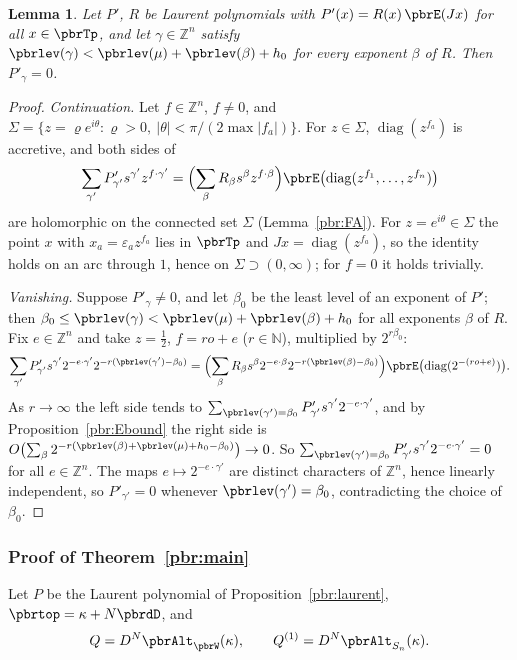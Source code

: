 \documentclass[10pt]{amsart}
\newtheorem{lemma}[theorem]{Lemma}
\theoremstyle{definition}
\theoremstyle{remark}
\newcommand{\N}{\mathbb N}
\newcommand{\Z}{\mathbb Z}
\begin{document}
\begin{lemma}\label{pbr:low}
Let $P'$, $R$ be Laurent polynomials with $P'(x)=R(x)\,\pbrE(Jx)$ for all $x\in\pbrTp$, and let
$\gamma\in\Z^n$ satisfy $\pbrlev(\gamma)<\pbrlev(\mu)+\pbrlev(\beta)+h_0$ for every exponent $\beta$ of
$R$. Then $P'_\gamma=0$.
\end{lemma}
\begin{proof}
\emph{Continuation.} Let $f\in\Z^n$, $f\ne0$, and $\Sigma=\{z=\varrho e^{i\theta}:\varrho>0,\ |\theta|<
\pi/(2\max|f_a|)\}$. For $z\in\Sigma$, $\operatorname{diag}(z^{f_a})$ is accretive, and both sides of
\[
\sum_{\gamma'}P'_{\gamma'}s^{\gamma'}z^{f\cdot\gamma'}=\Bigl(\sum_\beta R_\beta s^\beta z^{f\cdot\beta}
\Bigr)\pbrE\bigl(\operatorname{diag}(z^{f_1},\dots,z^{f_n})\bigr)
\]
are holomorphic on the connected set $\Sigma$ (Lemma~\ref{pbr:FA}). For $z=e^{i\theta}\in\Sigma$ the
point $x$ with $x_a=\varepsilon_az^{f_a}$ lies in $\pbrTp$ and $Jx=\operatorname{diag}(z^{f_a})$, so
the identity holds on an arc through $1$, hence on $\Sigma\supset(0,\infty)$; for $f=0$ it holds
trivially.

\emph{Vanishing.} Suppose $P'_\gamma\ne0$, and let $\beta_0$ be the least level of an exponent of $P'$;
then $\beta_0\le\pbrlev(\gamma)<\pbrlev(\mu)+\pbrlev(\beta)+h_0$ for all exponents $\beta$ of $R$. Fix
$e\in\Z^n$ and take $z=\frac12$, $f=ro+e$ ($r\in\N$), multiplied by $2^{r\beta_0}$:
\[
\sum_{\gamma'}P'_{\gamma'}s^{\gamma'}2^{-e\cdot\gamma'}2^{-r(\pbrlev(\gamma')-\beta_0)}=\Bigl(\sum_\beta
R_\beta s^\beta2^{-e\cdot\beta}2^{-r(\pbrlev(\beta)-\beta_0)}\Bigr)\pbrE\bigl(\operatorname{diag}(
2^{-(ro+e)})\bigr).
\]
As $r\to\infty$ the left side tends to $\sum_{\pbrlev(\gamma')=\beta_0}P'_{\gamma'}s^{\gamma'}2^{-e\cdot
\gamma'}$, and by Proposition~\ref{pbr:Ebound} the right side is $O\bigl(\sum_\beta2^{-r(\pbrlev(\beta)
+\pbrlev(\mu)+h_0-\beta_0)}\bigr)\to0$. So $\sum_{\pbrlev(\gamma')=\beta_0}P'_{\gamma'}s^{\gamma'}
2^{-e\cdot\gamma'}=0$ for all $e\in\Z^n$. The maps $e\mapsto2^{-e\cdot\gamma'}$ are distinct characters
of $\Z^n$, hence linearly independent, so $P'_{\gamma'}=0$ whenever $\pbrlev(\gamma')=\beta_0$,
contradicting the choice of $\beta_0$.
\end{proof}

\subsubsection{Proof of Theorem~\ref{pbr:main}}\label{pbr:ss-proof}

Let $P$ be the Laurent polynomial of Proposition~\ref{pbr:laurent}, $\pbrtop=\kappa+N\pbrdD$, and
\[
Q=D^N\pbrAlt_{\pbrW}(\kappa),\qquad Q^{(1)}=D^N\pbrAlt_{S_n}(\kappa).
\]
\end{document}
